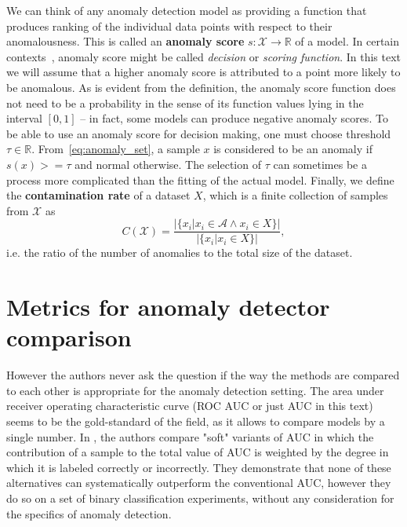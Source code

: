 We can think of any anomaly detection model as providing a function that produces ranking of the individual data points with respect to their anomalousness. This is called an \textbf{anomaly score} $s:\mathcal{X}\rightarrow\mathbb{R}$ of a model. In certain contexts~\cite{pedregosa2011scikit}, anomaly score might be called \textit{decision }or \textit{scoring function}. In this text we will assume that a higher anomaly score is attributed to a point more likely to be anomalous. As is evident from the definition, the anomaly score function does not need to be a probability in the sense of its function values lying in the interval $\left[0,1\right]$ -- in fact, some models can produce negative anomaly scores. To be able to use an anomaly score for decision making, one must choose threshold $\tau\in\mathbb{R}$. From~\eqref{eq:anomaly_set}, a sample $x$ is considered to be an anomaly if $s(x)>=\tau$ and normal otherwise. The selection of $\tau$ can sometimes be a process more complicated than the fitting of the actual model. Finally, we define the \textbf{contamination rate} of a dataset $X$, which is a finite collection of samples from $\mathcal{X}$ as
\begin{equation}
C(\mathcal{X})=\frac{|\{x_{i}|x_{i}\in \mathcal{A} \wedge x_i \in X \}|}{|\{x_{i}|x_{i}\in X\}|},
\end{equation}
i.e. the ratio of the number of anomalies to the total size of the dataset.

\section{Metrics for anomaly detector comparison}

However the authors never ask the question if the way the methods are compared to each other is appropriate for the anomaly detection setting. The area under receiver operating characteristic curve (ROC AUC or just AUC in this text) seems to be the gold-standard of the field, as it allows to compare models by a single number. In \cite{vanderlooy2008critical}, the authors compare "soft" variants of AUC in which the contribution of a sample to the total value of AUC is weighted by the degree in which it is labeled correctly or incorrectly. They demonstrate that none of these alternatives can systematically outperform the conventional AUC, however they do so on a set of binary classification experiments, without any consideration for the specifics of anomaly detection.


